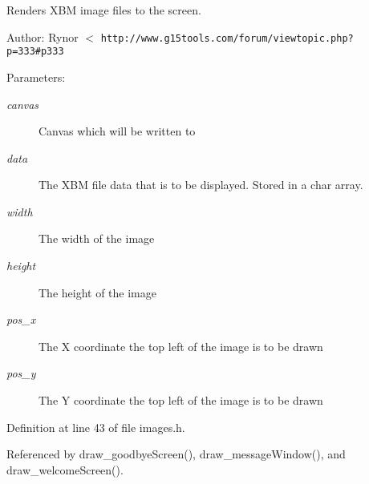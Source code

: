 Renders XBM image files to the screen.

\begin{Desc}
\item[Author:]Rynor $<$ {\tt http://www.g15tools.com/forum/viewtopic.php?p=333\#p333}\end{Desc}
\begin{Desc}
\item[Parameters:]
\begin{description}
\item[{\em canvas}]Canvas which will be written to \item[{\em data}]The XBM file data that is to be displayed. Stored in a char array. \item[{\em width}]The width of the image \item[{\em height}]The height of the image \item[{\em pos\_\-x}]The X coordinate the top left of the image is to be drawn \item[{\em pos\_\-y}]The Y coordinate the top left of the image is to be drawn \end{description}
\end{Desc}


Definition at line 43 of file images.h.

Referenced by draw\_\-goodbyeScreen(), draw\_\-messageWindow(), and draw\_\-welcomeScreen().